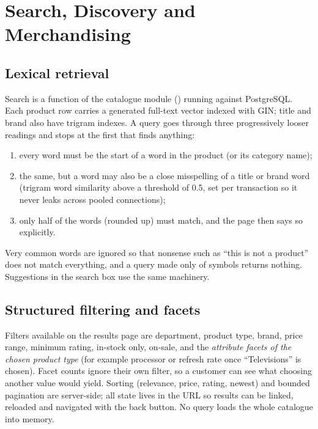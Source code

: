 \chapter{Search, Discovery and Merchandising}
\label{ch:search}

\section{Lexical retrieval}

Search is a function of the catalogue module () running against PostgreSQL. Each product row carries a generated full-text vector indexed with GIN; title and brand also have trigram indexes. A query goes through three progressively looser readings and stops at the first that finds anything:

\begin{enumerate}
\item every word must be the start of a word in the product (or its category name);
\item the same, but a word may also be a close misspelling of a title or brand word (trigram word similarity above a threshold of 0.5, set per transaction so it never leaks across pooled connections);
\item only half of the words (rounded up) must match, and the page then says so explicitly.
\end{enumerate}

Very common words are ignored so that nonsense such as ``this is not a product'' does not match everything, and a query made only of symbols returns nothing. Suggestions in the search box use the same machinery. \tagimpl{} \tagtest{}

\section{Structured filtering and facets}

Filters available on the results page are department, product type, brand, price range, minimum rating, in-stock only, on-sale, and the \emph{attribute facets of the chosen product type} (for example processor or refresh rate once ``Televisions'' is chosen). Facet counts ignore their own filter, so a customer can see what choosing another value would yield. Sorting (relevance, price, rating, newest) and bounded pagination are server-side; all state lives in the URL so results can be linked, reloaded and navigated with the back button. No query loads the whole catalogue into memory. \tagimpl{} \tagtest{}

